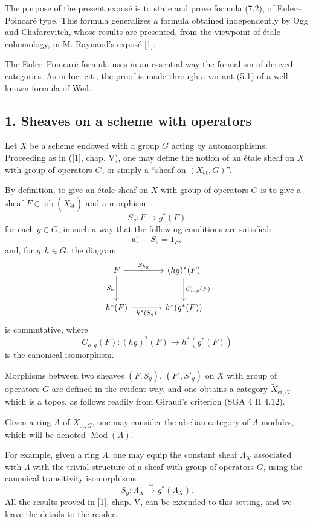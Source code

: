 \documentclass[11pt]{article}
\providecommand{\et}{\mathrm{\acute{e}t}}
\providecommand{\Ob}{\operatorname{ob}}
\providecommand{\Ob}{\operatorname{ob}}
\providecommand{\Ob}{\operatorname{Ob}}
\providecommand{\Mod}{\operatorname{Mod}}
\providecommand{\Ob}{\operatorname{ob}}
\begin{document}
The purpose of the present exposé is to state and prove formula (7.2), of Euler--Poincaré type. This formula generalizes a formula obtained independently by Ogg and Chafarevitch, whose results are presented, from the viewpoint of étale cohomology, in M. Raynaud's exposé [1].

The Euler--Poincaré formula uses in an essential way the formalism of derived categories. As in loc. cit., the proof is made through a variant (5.1) of a well-known formula of Weil.

\subsection*{1. Sheaves on a scheme with operators}

Let $X$ be a scheme endowed with a group $G$ acting by automorphisms. Proceeding as in ([1], chap. V), one may define the notion of an étale sheaf on $X$ with group of operators $G$, or simply a “sheaf on $(X_{\et},G)$”.

By definition, to give an étale sheaf on $X$ with group of operators $G$ is to give a sheaf $F\in \Ob(\widetilde X_{\et})$ and a morphism
\[
S_g:F\longrightarrow g^*(F)
\]
for each $g\in G$, in such a way that the following conditions are satisfied:
\[
\text{a) }\quad S_e=1_F,
\]
and, for $g,h\in G$, the diagram
\[
\begin{tikzcd}[column sep=large,row sep=large]
F \arrow[r,"S_{hg}"] \arrow[d,"S_h"'] & (hg)^*(F) \arrow[d,"C_{h,g}(F)"]\\
h^*(F) \arrow[r,"h^*(S_g)"'] & h^*(g^*(F))
\end{tikzcd}
\]
is commutative, where
\[
C_{h,g}(F):(hg)^*(F)\longrightarrow h^*(g^*(F))
\]
is the canonical isomorphism.

Morphisms between two sheaves $(F,S_g)$, $(F',S'_g)$ on $X$ with group of operators $G$ are defined in the evident way, and one obtains a category $\widetilde X_{\et,G}$ which is a topos, as follows readily from Giraud's criterion (SGA 4 II 4.12).

Given a ring $A$ of $\widetilde X_{\et,G}$, one may consider the abelian category of $A$-modules, which will be denoted $\Mod(A)$.

For example, given a ring $\Lambda$, one may equip the constant sheaf $\Lambda_X$ associated with $\Lambda$ with the trivial structure of a sheaf with group of operators $G$, using the canonical transitivity isomorphisms
\[
S_g:\Lambda_X\xrightarrow{\sim}g^*(\Lambda_X).
\]
All the results proved in [1], chap. V, can be extended to this setting, and we leave the details to the reader.
\end{document}

